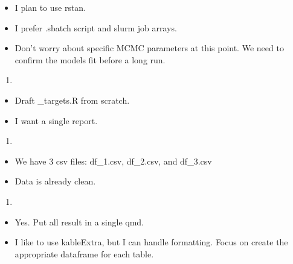 \documentclass[
  letterpaper,
]{article}
\providecommand{\tightlist}{%
  \setlength{\itemsep}{0pt}\setlength{\parskip}{0pt}}\usepackage{longtable,booktabs,array}
\begin{document}
\begin{itemize}
\tightlist
\item
  I plan to use rstan.\\
\item
  I prefer .sbatch script and slurm job arrays.
\item
  Don't worry about specific MCMC parameters at this point. We need to
  confirm the models fit before a long run.
\end{itemize}

\begin{enumerate}
\def\labelenumi{\arabic{enumi}.}
\setcounter{enumi}{3}
\tightlist
\item
\end{enumerate}

\begin{itemize}
\tightlist
\item
  Draft \_targets.R from scratch.
\item
  I want a single report.
\end{itemize}

\begin{enumerate}
\def\labelenumi{\arabic{enumi}.}
\setcounter{enumi}{4}
\tightlist
\item
\end{enumerate}

\begin{itemize}
\tightlist
\item
  We have 3 csv files: df\_1.csv, df\_2.csv, and df\_3.csv
\item
  Data is already clean.
\end{itemize}

\begin{enumerate}
\def\labelenumi{\arabic{enumi}.}
\setcounter{enumi}{5}
\tightlist
\item
\end{enumerate}

\begin{itemize}
\tightlist
\item
  Yes. Put all result in a single qmd.
\item
  I like to use kableExtra, but I can handle formatting. Focus on create
  the appropriate dataframe for each table.
\end{itemize}
\end{document}
